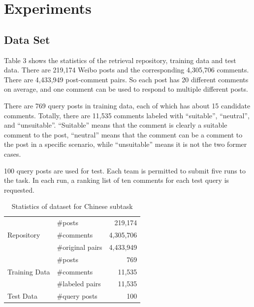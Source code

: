 \documentclass{sig-alternate}
\begin{document}
\section{Experiments}

\subsection{Data Set}
Table 3 shows the statistics of the retrieval repository, training
data and test data. There are 219,174 Weibo posts and the
corresponding 4,305,706 comments. There are 4,433,949 post-comment
pairs. So each post has 20 different comments on
average, and one comment can be used to respond to multiple
different posts. 

There are 769 query posts in training data, each of which has about 15 
candidate comments. Totally, there are 11,535 comments labeled with 
“suitable”, “neutral”, and “unsuitable”. “Suitable” means that the comment 
is clearly a suitable comment to the post, “neutral” means that the comment 
can be a comment to the post in a specific scenario, while “unsuitable” means 
it is not the two former cases. 

100 query posts are used for test. Each team is permitted to submit five
runs to the task. In each run, a ranking list of ten comments for
each test query is requested. 

\begin{table}
\centering
\caption{Statistics of dataset for Chinese subtask}
\label{my-label}
\begin{minipage}{\columnwidth}
\begin{center}
\begin{tabular}{|l@{\quad}|l@{\quad}|@{\quad}r|}
\hline
\multirow{3}{*}{Repository}
                  & \#posts           & 219,174   \\ \cline{2-3} 
                  & \#comments        & 4,305,706 \\ \cline{2-3} 
                  & \#original pairs  & 4,433,949 \\ \hline
\multirow{3}{*}{Training Data} 
                  & \#posts           & 769       \\ \cline{2-3} 
                  & \#comments        & 11,535    \\ \cline{2-3} 
                  & \#labeled pairs   & 11,535    \\ \hline
Test Data         & \#query posts     & 100       \\ \hline
\end{tabular}
\end{center}
\end{minipage}
\end{table}
\end{document}
